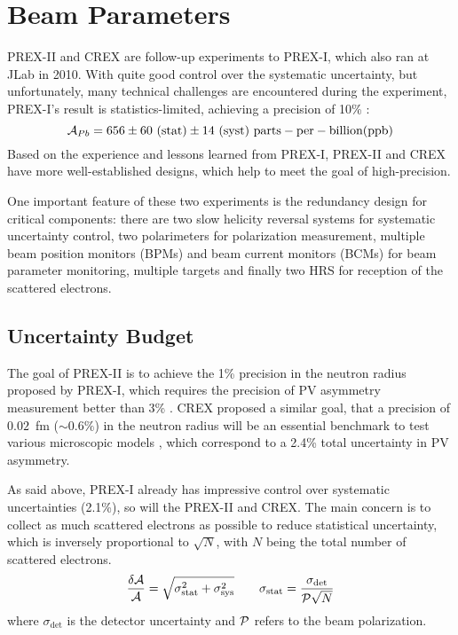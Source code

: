 \section{Beam Parameters}
PREX-II and CREX are follow-up experiments to PREX-I, which also ran at JLab in 2010. 
With quite good control over the systematic uncertainty, but unfortunately, 
many technical challenges are encountered during the experiment, PREX-I's result is 
statistics-limited, achieving a precision of 10\% \cite{PhysRevLett.108.112502}:
$$ \CA_{Pb} = 656 \pm 60 \ (\text{stat}) \pm 14 \ (\text{syst}) \ \mathrm{parts-per-billion (ppb)} $$
Based on the experience and lessons learned from PREX-I, 
PREX-II and CREX have more well-established designs, which help to
meet the goal of high-precision.

One important feature of these two experiments is the redundancy design for critical
components: there are two slow helicity reversal systems for systematic uncertainty control,
two polarimeters for polarization measurement, multiple beam position
monitors (BPMs) and beam current monitors (BCMs) for beam parameter monitoring, 
multiple \Pb targets and finally two HRS for reception of the scattered electrons.

\subsection{Uncertainty Budget}
The goal of PREX-II is to achieve the 1\% precision in the \Pb neutron radius proposed
by PREX-I, which requires the precision of PV asymmetry measurement better than 3\% \cite{PhysRevLett.106.252501}. 
CREX proposed a similar goal, that a precision of $0.02$~fm ($\sim 0.6\%$) in the
\Ca neutron radius will be an essential benchmark to test various microscopic 
models \cite{crex_proposal}, which correspond to a 2.4\% total uncertainty in PV asymmetry.

As said above, PREX-I already has impressive control over systematic uncertainties (2.1\%),
so will the PREX-II and CREX. The main concern is to collect as much scattered 
electrons as possible to reduce statistical uncertainty, which is inversely 
proportional to $\sqrt{N}$, with $N$ being the total number of scattered electrons.
\begin{equation}
    \frac{\delta \mathcal{A}}{\mathcal{A}} = \sqrt{\sigma^2_{\text{stat}} + \sigma^2_{\text{sys}}}	
    \qquad 
    \sigma_{\text{stat}} = \frac{\sigma_{\text{det}}}{\mathcal{P}\sqrt{N}}
\end{equation}
where $\sigma_{\text{det}}$ is the detector uncertainty and $\mathcal{P}$ refers to the beam polarization.

